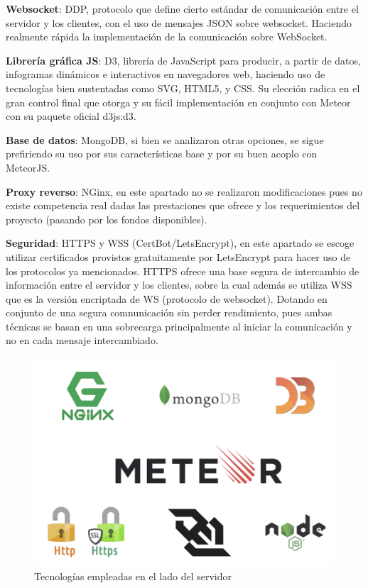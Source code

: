 \textbf{Websocket}: DDP, protocolo que define cierto estándar de comunicación entre el servidor y los clientes, con el uso de mensajes JSON sobre websocket. Haciendo realmente rápida la implementación de la comunicación sobre WebSocket.

\textbf{Librería gráfica JS}: D3, librería de JavaScript para producir, a partir de datos, infogramas dinámicos e interactivos en navegadores web, haciendo uso de tecnologías bien sustentadas como SVG, HTML5, y CSS. Su elección radica en el gran control final que otorga y su fácil implementación en conjunto con Meteor con su paquete oficial d3js:d3.

\textbf{Base de datos}: MongoDB, si bien se analizaron otras opciones, se sigue prefiriendo su uso por sus características base y por su buen acoplo con MeteorJS.

\textbf{Proxy reverso}: NGinx, en este apartado no se realizaron modificaciones pues no existe competencia real dadas las prestaciones que ofrece y los requerimientos del proyecto (pasando por los fondos disponibles). \newline

\textbf{Seguridad}: HTTPS y WSS (CertBot/LetsEncrypt), en este apartado se escoge utilizar certificados provistos gratuitamente por LetsEncrypt para hacer uso de los protocolos ya mencionados. HTTPS ofrece una base segura de intercambio de información entre el servidor y los clientes, sobre la cual además se utiliza WSS que es la versión encriptada de WS (protocolo de websocket). Dotando en conjunto de una segura comnunicación sin perder rendimiento, pues ambas técnicas se basan en una sobrecarga principalmente al iniciar la comunicación y no en cada mensaje intercambiado.

\begin{figure}[H]
	\centering
	\includegraphics[scale=0.6]{figuras/protof/tecnologias.png}
	\caption{Tecnologías empleadas en el lado del servidor}
	\label{tecnologias}
\end{figure}


